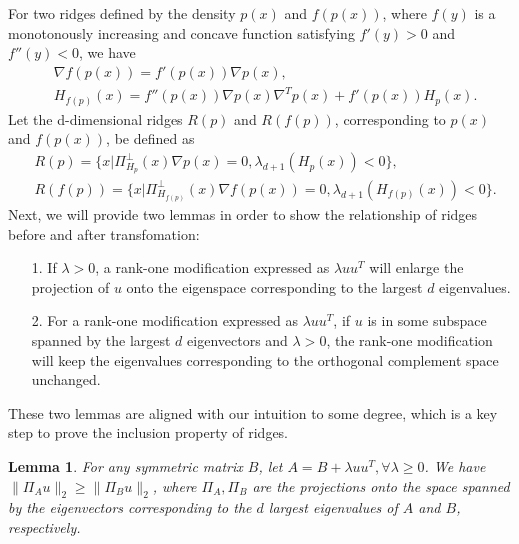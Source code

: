 \documentclass[aos,preprint]{imsart}
\newtheorem{lemma}[theorem]{Lemma}
\theoremstyle{remark}
\begin{document}
For two ridges defined by the density $p(x)$ and $f(p(x))$, where $f(y)$ is a monotonously increasing and  concave function satisfying $f'(y)>0$ and $f''(y)<0$, we have 
\begin{equation}\label{derivatef}
\begin{aligned}
&\nabla f(p(x)) = f'(p(x)) \nabla p(x),\\
&H_{f(p)}(x) = f''(p(x)) \nabla p(x) \nabla^T p(x) + f'(p(x)) H_{p}(x).
\end{aligned}
\end{equation}
Let the d-dimensional ridges $R(p)$ and $R(f(p))$, corresponding to $p(x)$ and $f(p(x))$, be defined as
\[
\begin{aligned}
&R({p}) = \{x | \Pi_{H_{p}}^{\perp} (x) \nabla p(x) = 0, \lambda_{d+1}(H_{p}(x))<0\}, \\
&R({f(p)}) = \{x | \Pi_{H_{f(p)}}^{\perp} (x) \nabla f(p(x)) = 0,\lambda_{d+1}(H_{f(p)}(x))<0\}.
\end{aligned}
\]
Next, we will provide two lemmas in order to show the relationship of ridges before and after transfomation:
\begin{itemize}
\item[1.]  If $\lambda>0$, a rank-one modification expressed as $\lambda uu^T$ will enlarge the projection of $u$ onto the eigenspace corresponding to the largest $d$ eigenvalues. 
\item[2.] For a rank-one modification expressed as $\lambda uu^T$, if $u$ is in some subspace spanned by the largest $d$ eigenvectors and $\lambda>0$, the rank-one modification will keep the eigenvalues corresponding to the orthogonal complement space unchanged.
\end{itemize}
These two lemmas are aligned with our intuition to some degree, which is a key step to prove the inclusion property of ridges.

\begin{lemma}{ For any symmetric matrix $B$, let $A = B +\lambda uu^T, \forall \lambda\geq 0$. We  have $\|\Pi_A u\|_2\geq \|\Pi_B u\|_2$, where $\Pi_A, \Pi_B$ are the projections onto the space spanned by the eigenvectors corresponding to the $d$ largest eigenvalues of $A$ and $B$, respectively.} \label{projection_enlarge}
\end{lemma}
\end{document}
